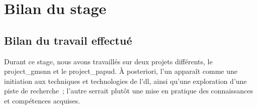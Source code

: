 






\makeatletter
\def\toclevel@chapter{-1}
\makeatother
\chapter{Bilan du stage}
\section{Bilan du travail effectué}
Durant ce stage, nous avons travaillés sur deux projets différents, le \gls{project_gmsnn} et le \gls{project_papud}.
À posteriori, l'un apparaît comme une initiation aux techniques et technologies de l'\gls{dl}, ainsi qu'une exploration d'une piste de recherche~; l'autre serrait plutôt une mise en pratique des connaissances et compétences acquises.

